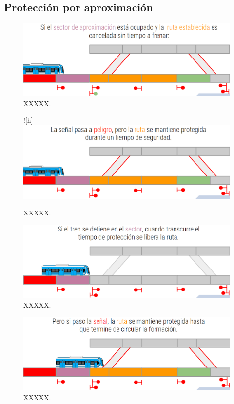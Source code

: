 \subsection{Protección por aproximación}

\lipsum[1]

    \begin{figure}[!h]
        \centering
        \includegraphics[width=1\textwidth]{Figuras/aproximacion_1}
        \centering\caption{XXXXX.}
        \label{fig:aproximacion_1}
    \end{figure}
    
\lipsum[1]

    \begin{figure}![h]
        \centering
        \includegraphics[width=1\textwidth]{Figuras/aproximacion_2}
        \centering\caption{XXXXX.}
        \label{fig:aproximacion_2}
    \end{figure}
    
\lipsum[1]

    \begin{figure}[!h]
        \centering
        \includegraphics[width=1\textwidth]{Figuras/aproximacion_3}
        \centering\caption{XXXXX.}
        \label{fig:aproximacion_3}
    \end{figure}
    
\lipsum[1]

    \begin{figure}[!h]
        \centering
        \includegraphics[width=1\textwidth]{Figuras/aproximacion_4}
        \centering\caption{XXXXX.}
        \label{fig:aproximacion_4}
    \end{figure}
    
\lipsum[1]